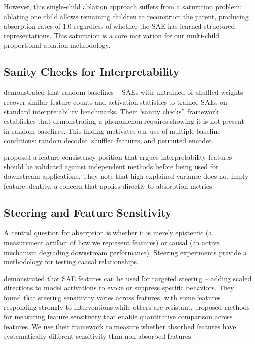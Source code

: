 \documentclass{article}
\begin{document}
However, this single-child ablation approach suffers from a saturation problem: ablating one child allows remaining children to reconstruct the parent, producing absorption rates of 1.0 regardless of whether the SAE has learned structured representations. This saturation is a core motivation for our multi-child proportional ablation methodology.

\subsection{Sanity Checks for Interpretability}

\citet{korznikov2026} demonstrated that random baselines -- SAEs with untrained or shuffled weights -- recover similar feature counts and activation statistics to trained SAEs on standard interpretability benchmarks. Their ``sanity checks'' framework establishes that demonstrating a phenomenon requires showing it is not present in random baselines. This finding motivates our use of multiple baseline conditions: random decoder, shuffled features, and permuted encoder.

\citet{song2025} proposed a feature consistency position that argues interpretability features should be validated against independent methods before being used for downstream applications. They note that high explained variance does not imply feature identity, a concern that applies directly to absorption metrics.

\subsection{Steering and Feature Sensitivity}

A central question for absorption is whether it is merely epistemic (a measurement artifact of how we represent features) or causal (an active mechanism degrading downstream performance). Steering experiments provide a methodology for testing causal relationships.

\citet{o_brien2024} demonstrated that SAE features can be used for targeted steering -- adding scaled directions to model activations to evoke or suppress specific behaviors. They found that steering sensitivity varies across features, with some features responding strongly to interventions while others are resistant. \citet{tian2025} proposed methods for measuring feature sensitivity that enable quantitative comparison across features. We use their framework to measure whether absorbed features have systematically different sensitivity than non-absorbed features.
\end{document}
